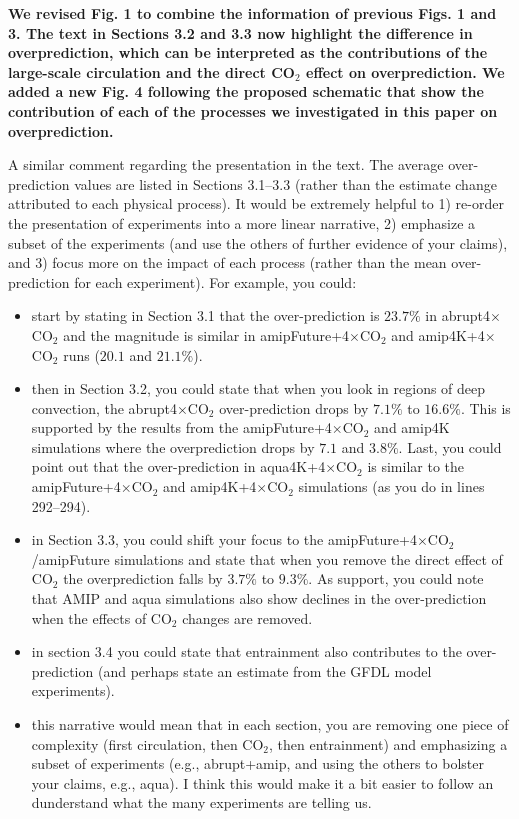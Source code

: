 \documentclass[11pt]{article}
\begin{document}
\textbf{We revised Fig. 1 to combine the information of previous Figs. 1 and 3. The text in Sections 3.2 and 3.3 now highlight the difference in overprediction, which can be interpreted as the contributions of the large-scale circulation and the direct CO$_2$ effect on overprediction. We added a new Fig. 4 following the proposed schematic that show the contribution of each of the processes we investigated in this paper on overprediction.}

A similar comment regarding the presentation in the text. The average over-prediction values are listed in Sections 3.1--3.3 (rather than the estimate change attributed to each physical process). It would be extremely helpful to 1) re-order the presentation of experiments into a more linear narrative, 2) emphasize a subset of the experiments (and use the others of further evidence of your claims), and 3) focus more on the impact of each process (rather than the mean over-prediction for each experiment). For example, you could:
\begin{itemize}
\item start by stating in Section 3.1 that the over-prediction is \(23.7\%\) in abrupt4\(\times\)CO\(_2\) and the magnitude is similar in amipFuture+4\(\times\)CO\(_2\) and amip4K+4\(\times\)CO\(_2\) runs (\(20.1\) and \(21.1\%\)).
\item then in Section 3.2, you could state that when you look in regions of deep convection, the abrupt4\(\times\)CO\(_2\) over-prediction drops by \(7.1\%\) to \(16.6\%\). This is supported by the results from the amipFuture+4\(\times\)CO\(_2\) and amip4K simulations where the overprediction drops by \(7.1\) and \(3.8\%\). Last, you could point out that the over-prediction in aqua4K+4\(\times\)CO\(_2\) is similar to the amipFuture+4\(\times\)CO\(_2\) and amip4K+4\(\times\)CO\(_2\) simulations (as you do in lines 292--294).
\item in Section 3.3, you could shift your focus to the amipFuture+4\(\times\)CO\(_2\)/amipFuture simulations and state that when you remove the direct effect of CO\(_2\) the overprediction falls by \(3.7\%\) to \(9.3\%\). As support, you could note that AMIP and aqua simulations also show declines in the over-prediction when the effects of CO\(_2\) changes are removed.
\item in section 3.4 you could state that entrainment also contributes to the over-prediction (and perhaps state an estimate from the GFDL model experiments).
\item this narrative would mean that in each section, you are removing one piece of complexity (first circulation, then CO\(_2\), then entrainment) and emphasizing a subset of experiments (e.g., abrupt+amip, and using the others to bolster your claims, e.g., aqua). I think this would make it a bit easier to follow an dunderstand what the many experiments are telling us.
\end{itemize}
\end{document}
